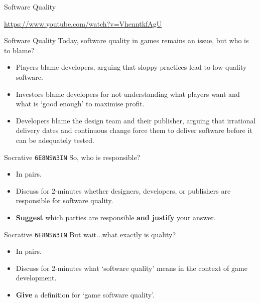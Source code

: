\begin{frame}{Software Quality}
	\begin{center}
        \url{https://www.youtube.com/watch?v=VhenntkfAgU}
    \end{center}
\end{frame}

\begin{frame}{Software Quality}
	Today, software quality in games remains an issue, but who is to blame? \pause
	
	\begin{itemize}
		\item Players blame developers, arguing that sloppy practices lead to low-quality software. \pause
		\item Investors blame developers for not understanding what players want and what is `good enough' to maximise profit. \pause
		\item Developers blame the design team and their publisher, arguing that irrational delivery dates and continuous
		change force them to deliver software before it can be adequately tested.
	\end{itemize}
\end{frame}

\begin{frame}{Socrative \texttt{6E8NSW3IN}}
	So, who is responsible?
	\begin{itemize}
		\item In pairs.
		\item Discuss for 2-minutes whether designers, developers, or publishers are responsible for software quality.
		\item \textbf{Suggest} which parties are responsible \textbf{and justify} your answer. 
	\end{itemize}
\end{frame}

\begin{frame}{Socrative \texttt{6E8NSW3IN}}
	But wait...what exactly is quality?
	
	\begin{itemize}
		\item In pairs.
		\item Discuss for 2-minutes what `software quality' means in the context of game development.
		\item \textbf{Give} a definition for `game software quality'. 
	\end{itemize}
\end{frame}

